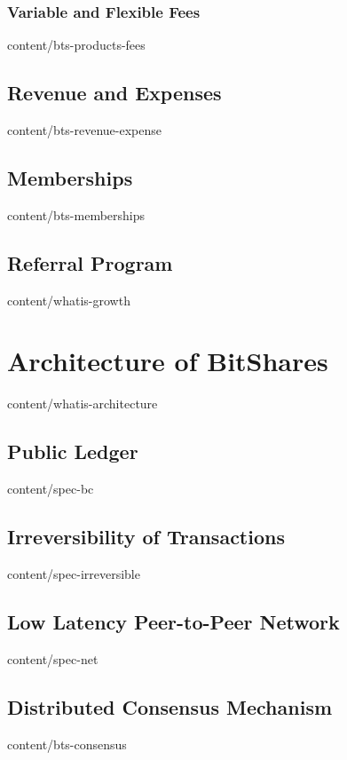\documentclass[unpublished]{btswhitepaper}
\begin{document}
\subsubsection { Variable and Flexible Fees        }  { content/bts-products-fees   }

\subsection    { Revenue and Expenses              }  { content/bts-revenue-expense }
\subsection    { Memberships                       }  { content/bts-memberships     }
\subsection    { Referral Program                  }  { content/whatis-growth       } 

\section       { Architecture of BitShares         }  { content/whatis-architecture } 
\subsection    { Public Ledger                     }  { content/spec-bc             } 
\subsection    { Irreversibility of Transactions   }  { content/spec-irreversible   }
\subsection    { Low Latency Peer-to-Peer Network  }  { content/spec-net            } 
\subsection    { Distributed Consensus Mechanism   }  { content/bts-consensus       } 
\end{document}
